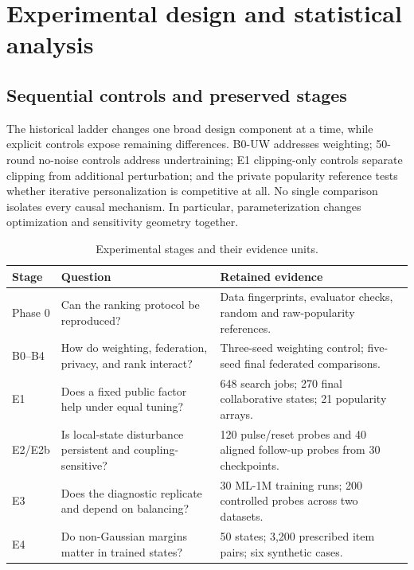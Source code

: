 \section{Experimental design and statistical analysis}
\label{sec:design}
\subsection{Sequential controls and preserved stages}
The historical ladder changes one broad design component at a time, while
explicit controls expose remaining differences. B0-UW addresses weighting;
50-round no-noise controls address undertraining; E1 clipping-only controls
separate clipping from additional perturbation; and the private popularity
reference tests whether iterative personalization is competitive at all.
No single comparison isolates every causal mechanism. In particular,
parameterization changes optimization and sensitivity geometry together.

\begin{table}[tbp]\centering\small
\caption{Experimental stages and their evidence units.}
\label{tab:stages}
\begin{tabularx}{\linewidth}{lYY}\toprule
Stage & Question & Retained evidence \\\midrule
Phase 0 & Can the ranking protocol be reproduced? & Data fingerprints, evaluator checks, random and raw-popularity references. \\
B0--B4 & How do weighting, federation, privacy, and rank interact? & Three-seed weighting control; five-seed final federated comparisons. \\
E1 & Does a fixed public factor help under equal tuning? & 648 search jobs; 270 final collaborative states; 21 popularity arrays. \\
E2/E2b & Is local-state disturbance persistent and coupling-sensitive? & 120 pulse/reset probes and 40 aligned follow-up probes from 30 checkpoints. \\
E3 & Does the diagnostic replicate and depend on balancing? & 30 ML-1M training runs; 200 controlled probes across two datasets. \\
E4 & Do non-Gaussian margins matter in trained states? & 50 states; 3,200 prescribed item pairs; six synthetic cases. \\
\bottomrule\end{tabularx}
\end{table}

